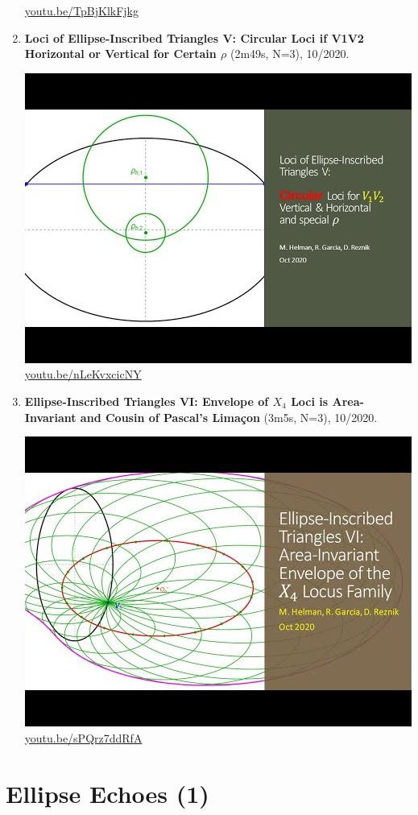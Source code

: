 \documentclass[12pt]{amsart}
\begin{document}
\begin{enumerate}[resume]
\begin{center}
\href{https://youtu.be/TpBjKlkFjkg}{\url{youtu.be/TpBjKlkFjkg}}\end{center}
% 
\item \textbf{Loci of Ellipse-Inscribed Triangles V: Circular Loci if V1V2 Horizontal or Vertical for Certain $\rho$} (2m49s, N=3), 10/2020. 
\begin{center}\includegraphics[width=.5\textwidth]{pics/nLeKvxcicNY.jpg} \\ 
\href{https://youtu.be/nLeKvxcicNY}{\url{youtu.be/nLeKvxcicNY}}\end{center}
% 
\item \textbf{Ellipse-Inscribed Triangles VI: Envelope of $X_{4}$ Loci is Area-Invariant and Cousin of Pascal's Limaçon} (3m5s, N=3), 10/2020. 
\begin{center}\includegraphics[width=.5\textwidth]{pics/sPQrz7ddRfA.jpg} \\ 
\href{https://youtu.be/sPQrz7ddRfA}{\url{youtu.be/sPQrz7ddRfA}}\end{center}
% 
\end{enumerate}

\section{Ellipse Echoes (1)}
\end{document}
